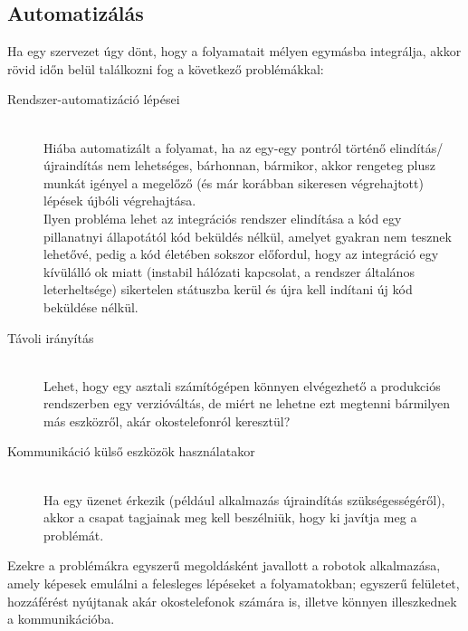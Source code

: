 \subsection{Automatizálás}
\label{subsec:automating}
Ha egy szervezet úgy dönt, hogy a folyamatait mélyen egymásba integrálja, akkor rövid időn belül találkozni fog a következő problémákkal:
\begin{description}
\item[Rendszer-automatizáció lépései]\hfill\\
Hiába automatizált a folyamat, ha az egy-egy pontról történő elindítás/újraindítás nem lehetséges, bárhonnan, bármikor, akkor rengeteg plusz munkát igényel a megelőző (és már korábban sikeresen végrehajtott) lépések újbóli végrehajtása.\\
Ilyen probléma lehet az integrációs rendszer elindítása a kód egy pillanatnyi állapotától kód beküldés nélkül, amelyet gyakran nem tesznek lehetővé, pedig a kód életében sokszor előfordul, hogy az integráció egy kívülálló ok miatt (instabil hálózati kapcsolat, a rendszer általános leterheltsége) sikertelen státuszba kerül és újra kell indítani új kód beküldése nélkül.

\item[Távoli irányítás]\hfill\\
Lehet, hogy egy asztali számítógépen könnyen elvégezhető a produkciós rendszerben egy verzióváltás, de miért ne lehetne ezt megtenni bármilyen más eszközről, akár okostelefonról keresztül?

\item[Kommunikáció külső eszközök használatakor]\hfill\\
Ha egy üzenet érkezik (például alkalmazás újraindítás szükségességéről), akkor a csapat tagjainak meg kell beszélniük, hogy ki javítja meg a problémát.
\end{description}

Ezekre a problémákra egyszerű megoldásként javallott a robotok alkalmazása, amely képesek emulálni a felesleges lépéseket a folyamatokban; egyszerű felületet, hozzáférést nyújtanak akár okostelefonok számára is, illetve könnyen illeszkednek a kommunikációba.

